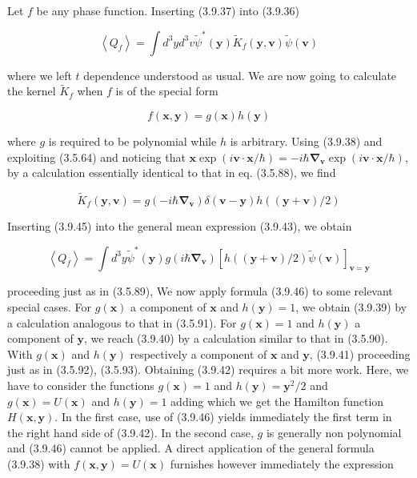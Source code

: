 \documentclass{article}
\begin{document}
Let $f$ be any phase function. Inserting (3.9.37) into (3.9.36)
 
\begin{equation*}
\left\langle Q_{f}\right\rangle=\int d^{3} y d^{3} v \tilde{\psi}^{*}(\boldsymbol{y}) \tilde{K}_{f}(\boldsymbol{y}, \boldsymbol{v}) \tilde{\psi}(\boldsymbol{v}) \tag{3.9.43}
\end{equation*}
 
where we left $t$ dependence understood as usual. We are now going to calculate the kernel $\tilde{K}_{f}$ when $f$ is of the special form
 
\begin{equation*}
f(\boldsymbol{x}, \boldsymbol{y})=g(\boldsymbol{x}) h(\boldsymbol{y}) \tag{3.9.44}
\end{equation*}
 
where $g$ is required to be polynomial while $h$ is arbitrary. Using (3.9.38) and exploiting (3.5.64) and noticing that $\boldsymbol{x} \exp (i \boldsymbol{v} \cdot \boldsymbol{x} / \hbar)=-i \hbar \boldsymbol{\nabla}_{\boldsymbol{v}} \exp (i \boldsymbol{v} \cdot \boldsymbol{x} / \hbar)$, by a calculation essentially identical to that in eq. (3.5.88), we find
 
\begin{equation*}
\tilde{K}_{f}(\boldsymbol{y}, \boldsymbol{v})=g\left(-i \hbar \boldsymbol{\nabla}_{\boldsymbol{v}}\right) \delta(\boldsymbol{v}-\boldsymbol{y}) h((\boldsymbol{y}+\boldsymbol{v}) / 2) \tag{3.9.45}
\end{equation*}
 

Inserting (3.9.45) into the general mean expression (3.9.43), we obtain
 
\begin{equation*}
\left\langle Q_{f}\right\rangle=\int d^{3} y \tilde{\psi}^{*}(\boldsymbol{y}) g\left(i \hbar \boldsymbol{\nabla}_{\boldsymbol{v}}\right)[h((\boldsymbol{y}+\boldsymbol{v}) / 2) \tilde{\psi}(\boldsymbol{v})]_{\boldsymbol{v}=\boldsymbol{y}} \tag{3.9.46}
\end{equation*}
 
proceeding just as in (3.5.89),
We now apply formula (3.9.46) to some relevant special cases. For $g(\boldsymbol{x})$ a component of $\boldsymbol{x}$ and $h(\boldsymbol{y})=1$, we obtain (3.9.39) by a calculation analogous to that in (3.5.91). For $g(\boldsymbol{x})=1$ and $h(\boldsymbol{y})$ a component of $\boldsymbol{y}$, we reach (3.9.40) by a calculation similar to that in (3.5.90). With $g(\boldsymbol{x})$ and $h(\boldsymbol{y})$ respectively a component of $\boldsymbol{x}$ and $\boldsymbol{y}$, (3.9.41) proceeding just as in (3.5.92), (3.5.93). Obtaining (3.9.42) requires a bit more work. Here, we have to consider the functions $g(\boldsymbol{x})=1$ and $h(\boldsymbol{y})=\boldsymbol{y}^{2} / 2$ and $g(\boldsymbol{x})=U(\boldsymbol{x})$ and $h(\boldsymbol{y})=1$ adding which we get the Hamilton function $H(\boldsymbol{x}, \boldsymbol{y})$. In the first case, use of (3.9.46) yields immediately the first term in the right hand side of (3.9.42). In the second case, $g$ is generally non polynomial and (3.9.46) cannot be applied. A direct application of the general formula (3.9.38) with $f(\boldsymbol{x}, \boldsymbol{y})=U(\boldsymbol{x})$ furnishes however immediately the expression
 
\end{document}
